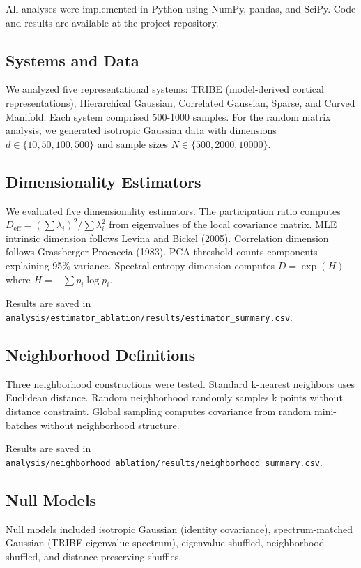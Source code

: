All analyses were implemented in Python using NumPy, pandas, and SciPy. Code and results are available at the project repository.

\subsection{Systems and Data}

We analyzed five representational systems: TRIBE (model-derived cortical representations), Hierarchical Gaussian, Correlated Gaussian, Sparse, and Curved Manifold. Each system comprised 500-1000 samples. For the random matrix analysis, we generated isotropic Gaussian data with dimensions $d \in \{10, 50, 100, 500\}$ and sample sizes $N \in \{500, 2000, 10000\}$.

\subsection{Dimensionality Estimators}

We evaluated five dimensionality estimators. The participation ratio computes $D_{\text{eff}} = (\sum \lambda_i)^2 / \sum \lambda_i^2$ from eigenvalues of the local covariance matrix. MLE intrinsic dimension follows Levina and Bickel (2005). Correlation dimension follows Grassberger-Procaccia (1983). PCA threshold counts components explaining 95\% variance. Spectral entropy dimension computes $D = \exp(H)$ where $H = -\sum p_i \log p_i$.

Results are saved in \texttt{analysis/estimator\_ablation/results/estimator\_summary.csv}.

\subsection{Neighborhood Definitions}

Three neighborhood constructions were tested. Standard k-nearest neighbors uses Euclidean distance. Random neighborhood randomly samples k points without distance constraint. Global sampling computes covariance from random mini-batches without neighborhood structure.

Results are saved in \texttt{analysis/neighborhood\_ablation/results/neighborhood\_summary.csv}.

\subsection{Null Models}

Null models included isotropic Gaussian (identity covariance), spectrum-matched Gaussian (TRIBE eigenvalue spectrum), eigenvalue-shuffled, neighborhood-shuffled, and distance-preserving shuffles.

